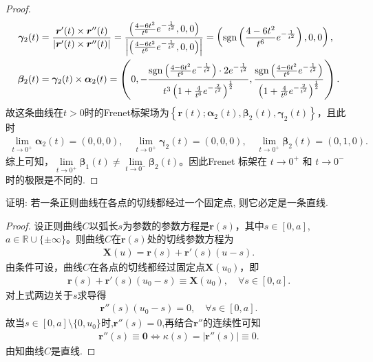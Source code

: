 \documentclass[../../main.tex]{subfiles}%
\begin{document}
\begin{proof}
\begin{align*}
\bm{\gamma}_2(t) &= \frac{\bm{r}'(t) \times \bm{r}''(t)}{|\bm{r}'(t) \times \bm{r}''(t)|} = \frac{\left( \frac{4-6t^2}{t^6}e^{-\frac{1}{t^2}},0,0 \right)}{\left| \left( \frac{4-6t^2}{t^6}e^{-\frac{1}{t^2}},0,0 \right) \right|} = \left( \operatorname{sgn}\left( \frac{4-6t^2}{t^6}e^{-\frac{1}{t^2}} \right) ,0,0 \right), \\
\bm{\beta}_2(t) &= \bm{\gamma}_2(t) \times \bm{\alpha}_2(t) = \left( 0,-\frac{\operatorname{sgn}\left( \frac{4-6t^2}{t^6}e^{-\frac{1}{t^2}} \right) \cdot 2e^{-\frac{1}{t^2}}}{t^3\left( 1+\frac{4}{t^6}e^{-\frac{2}{t^2}} \right)^{\frac{1}{2}}},\frac{\operatorname{sgn}\left( \frac{4-6t^2}{t^6}e^{-\frac{1}{t^2}} \right)}{\left( 1+\frac{4}{t^6}e^{-\frac{2}{t^2}} \right)^{\frac{1}{2}}} \right) .
\end{align*}
故这条曲线在$t>0$时的Frenet标架场为$\left\{ \bm{r}(t);\bm{\alpha}_2(t),\bm{\beta}_2(t),\bm{\gamma}_2(t) \right\}$，且此时
\begin{align*}
\lim\limits_{t\rightarrow 0^+}\bm{\alpha}_2(t) = \left( 0,0,0 \right), \quad \lim\limits_{t\rightarrow 0^+}\bm{\gamma}_2(t) = \left( 0,0,0 \right), \quad
\lim\limits_{t\rightarrow 0^+}\bm{\beta}_2(t) = \left( 0,1,0 \right) .
\end{align*}
综上可知，$\lim\limits_{t\rightarrow 0^+}\bm{\beta}_1(t) \ne \lim\limits_{t\rightarrow 0^-}\bm{\beta}_2(t)$。因此Frenet 标架在 $t \to 0^+$ 和 $t \to 0^-$ 时的极限是不同的.
\end{proof}

\begin{example}
证明: 若一条正则曲线在各点的切线都经过一个固定点, 则它必定是一条直线.
\end{example}
\begin{proof}
设正则曲线$C$以弧长$s$为参数的参数方程是$\bm{r}(s)$，其中$s\in[0,a]$,$a\in \mathbb{R}\cup\{\pm \infty\}$。则曲线$C$在$\bm{r}(s)$处的切线参数方程为
\begin{align*}
\bm{X}(u)=\bm{r}(s)+\bm{r}'(s)(u-s).
\end{align*}
由条件可设，曲线$C$在各点的切线都经过固定点$\bm{X}(u_0)$，即
\begin{align*}
\bm{r}(s)+\bm{r}'(s)(u_0-s)\equiv \bm{X}(u_0),\quad \forall s\in[0,a].
\end{align*}
对上式两边关于$s$求导得
\begin{align*}
\bm{r}''(s)(u_0-s)=0,\quad \forall s\in[0,a].
\end{align*}
故当$s\in [0,a]\setminus \{0,u_0\}$时,$\bm{r}''(s)=0$,再结合$\bm{r}''$的连续性可知
\begin{align*}
\bm{r}''(s)\equiv \bm{0}\Longleftrightarrow \kappa(s)=|\bm{r}''(s)|\equiv 0.
\end{align*}
由知曲线$C$是直线.
\end{proof}
\end{document}
